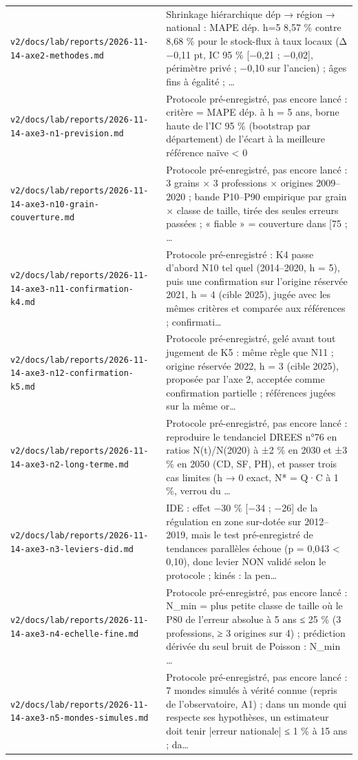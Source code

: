 \begin{small}
\begin{longtable}{@{}p{}p{}@{}}
\texttt{v2/docs/lab/reports/2026-11-14-axe2-methodes.md} & Shrinkage hiérarchique dép → région → national : MAPE dép. h=5 8,57 \% contre 8,68 \% pour le stock-flux à taux locaux (Δ −0,11 pt, IC 95 \% [−0,21 ; −0,02], périmètre privé ; −0,10 sur l'ancien) ; âges fins à égalité ; … \\
\texttt{v2/docs/lab/reports/2026-11-14-axe3-n1-prevision.md} & Protocole pré-enregistré, pas encore lancé : critère = MAPE dép. à h = 5 ans, borne haute de l'IC 95 \% (bootstrap par département) de l'écart à la meilleure référence naïve < 0 \\
\texttt{v2/docs/lab/reports/2026-11-14-axe3-n10-grain-couverture.md} & Protocole pré-enregistré, pas encore lancé : 3 grains × 3 professions × origines 2009–2020 ; bande P10–P90 empirique par grain × classe de taille, tirée des seules erreurs passées ; « fiable » = couverture dans [75 ; … \\
\texttt{v2/docs/lab/reports/2026-11-14-axe3-n11-confirmation-k4.md} & Protocole pré-enregistré : K4 passe d'abord N10 tel quel (2014–2020, h = 5), puis une confirmation sur l'origine réservée 2021, h = 4 (cible 2025), jugée avec les mêmes critères et comparée aux références ; confirmati… \\
\texttt{v2/docs/lab/reports/2026-11-14-axe3-n12-confirmation-k5.md} & Protocole pré-enregistré, gelé avant tout jugement de K5 : même règle que N11 ; origine réservée 2022, h = 3 (cible 2025), proposée par l'axe 2, acceptée comme confirmation partielle ; références jugées sur la même or… \\
\texttt{v2/docs/lab/reports/2026-11-14-axe3-n2-long-terme.md} & Protocole pré-enregistré, pas encore lancé : reproduire le tendanciel DREES n°76 en ratios N(t)/N(2020) à ±2 \% en 2030 et ±3 \% en 2050 (CD, SF, PH), et passer trois cas limites (h → 0 exact, N* = Q·C à 1 \%, verrou du … \\
\texttt{v2/docs/lab/reports/2026-11-14-axe3-n3-leviers-did.md} & IDE : effet −30 \% [−34 ; −26] de la régulation en zone sur-dotée sur 2012–2019, mais le test pré-enregistré de tendances parallèles échoue (p = 0,043 < 0,10), donc levier NON validé selon le protocole ; kinés : la pen… \\
\texttt{v2/docs/lab/reports/2026-11-14-axe3-n4-echelle-fine.md} & Protocole pré-enregistré, pas encore lancé : N\_min = plus petite classe de taille où le P80 de l'erreur absolue à 5 ans ≤ 25 \% (3 professions, ≥ 3 origines sur 4) ; prédiction dérivée du seul bruit de Poisson : N\_min … \\
\texttt{v2/docs/lab/reports/2026-11-14-axe3-n5-mondes-simules.md} & Protocole pré-enregistré, pas encore lancé : 7 mondes simulés à vérité connue (repris de l'observatoire, A1) ; dans un monde qui respecte ses hypothèses, un estimateur doit tenir |erreur nationale| ≤ 1 \% à 15 ans ; da… \\

\end{longtable}
\end{small}
